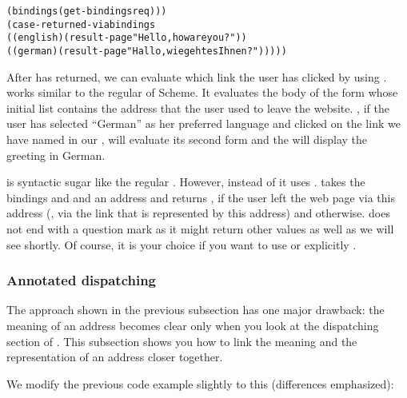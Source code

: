 \begin{alltt}
             (bindings (get-bindings req)))
        (case-returned-via bindings
          ((english) (result-page "Hello, how are you?"))
          ((german) (result-page "Hallo, wie geht es Ihnen?")))))
\end{alltt}

After  has returned, we can evaluate which
link the user has clicked by using .
 works similar to the regular  of
Scheme.  It evaluates the body of the form whose initial list contains
the address that the user used to leave the website.  \Eg, if the user
has selected ``German'' as her preferred language and clicked on the
link we have named  in our \surflet,
 will evaluate its second form and the
\surflet will display the greeting in German.

 is syntactic sugar like the regular
.  However, instead of  it uses
.   takes the bindings and 
and an address and returns \sharpt, if the user left the web page via
this address (\ie, via the link that is represented by this address)
and \sharpf otherwise.   does not end with a
question mark as it might return other values as well as we will see
shortly.  Of course, it is your choice if you want to use
 or explicitly .


\subsubsection{Annotated dispatching}

The approach shown in the previous subsection has one major drawback:
the meaning of an address becomes clear only when you look at the
dispatching section of .  This subsection
shows you how to link the meaning and the representation of an address
closer together.

We modify the previous code example slightly to this \surflet
(differences emphasized):

